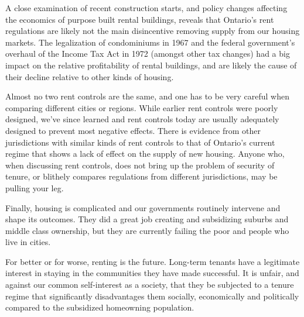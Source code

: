 A close examination of recent construction starts, and policy changes affecting the economics of purpose built rental buildings, reveals that Ontario's rent regulations are likely not the main disincentive removing supply from our housing markets. The legalization of condominiums in 1967 and the federal government's overhaul of the Income Tax Act in 1972 (amongst other tax changes) had a big impact on the relative profitability of rental buildings, and are likely the cause of their decline relative to other kinds of housing.

Almost no two rent controls are the same, and one has to be very careful when comparing different cities or regions. While earlier rent controls were poorly designed, we've since learned and rent controls today are usually adequately designed to prevent most negative effects. There is evidence from other jurisdictions with similar kinds of rent controls to that of Ontario's current regime that shows a lack of effect on the supply of new housing. Anyone who, when discussing rent controls, does not bring up the problem of security of tenure, or blithely compares regulations from different jurisdictions, may be pulling your leg.


Finally, housing is complicated and our governments routinely intervene and shape its outcomes. They did a great job creating and subsidizing suburbs and middle class ownership, but they are currently failing the poor and people who live in cities. 

For better or for worse, renting is the future. Long-term tenants have a legitimate interest in staying in the communities they have made successful. It is unfair, and against our common self-interest as a society, that they be subjected to a tenure regime that significantly disadvantages them socially, economically and politically compared to the subsidized homeowning population.

